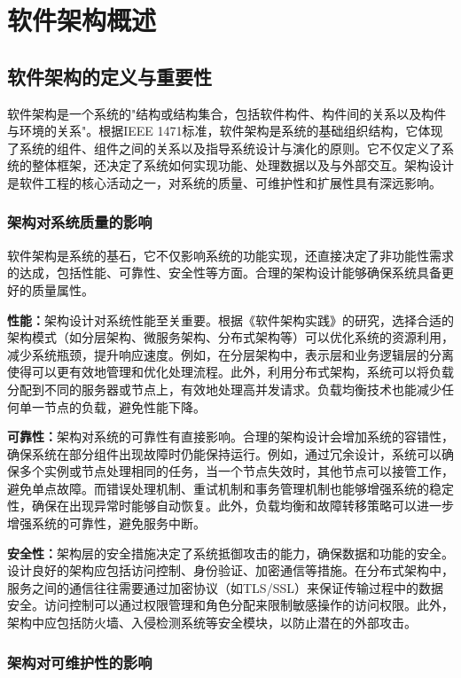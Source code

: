 \section{软件架构概述}

\subsection{软件架构的定义与重要性}

软件架构是一个系统的"结构或结构集合，包括软件构件、构件间的关系以及构件与环境的关系"。根据IEEE 1471标准，软件架构是系统的基础组织结构，它体现了系统的组件、组件之间的关系以及指导系统设计与演化的原则。它不仅定义了系统的整体框架，还决定了系统如何实现功能、处理数据以及与外部交互。架构设计是软件工程的核心活动之一，对系统的质量、可维护性和扩展性具有深远影响。

\subsubsection{架构对系统质量的影响}

软件架构是系统的基石，它不仅影响系统的功能实现，还直接决定了非功能性需求的达成，包括性能、可靠性、安全性等方面。合理的架构设计能够确保系统具备更好的质量属性。

\textbf{性能：}架构设计对系统性能至关重要。根据《软件架构实践》的研究，选择合适的架构模式（如分层架构、微服务架构、分布式架构等）可以优化系统的资源利用，减少系统瓶颈，提升响应速度。例如，在分层架构中，表示层和业务逻辑层的分离使得可以更有效地管理和优化处理流程。此外，利用分布式架构，系统可以将负载分配到不同的服务器或节点上，有效地处理高并发请求。负载均衡技术也能减少任何单一节点的负载，避免性能下降。

\textbf{可靠性：}架构对系统的可靠性有直接影响。合理的架构设计会增加系统的容错性，确保系统在部分组件出现故障时仍能保持运行。例如，通过冗余设计，系统可以确保多个实例或节点处理相同的任务，当一个节点失效时，其他节点可以接管工作，避免单点故障。而错误处理机制、重试机制和事务管理机制也能够增强系统的稳定性，确保在出现异常时能够自动恢复。此外，负载均衡和故障转移策略可以进一步增强系统的可靠性，避免服务中断。

\textbf{安全性：}架构层的安全措施决定了系统抵御攻击的能力，确保数据和功能的安全。设计良好的架构应包括访问控制、身份验证、加密通信等措施。在分布式架构中，服务之间的通信往往需要通过加密协议（如TLS/SSL）来保证传输过程中的数据安全。访问控制可以通过权限管理和角色分配来限制敏感操作的访问权限。此外，架构中应包括防火墙、入侵检测系统等安全模块，以防止潜在的外部攻击。

\subsubsection{架构对可维护性的影响}


